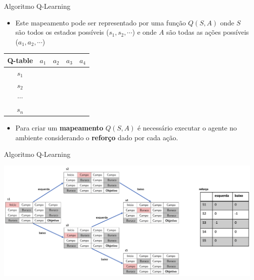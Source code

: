 \documentclass{beamer}
\begin{document}
\begin{frame}{Algoritmo Q-Learning}
	
\begin{itemize}
	
	\item Este mapeamento pode ser representado por uma função $Q(S,A)$ onde $S$ são 
	todos os estados possíveis ($s_{1}, s_{2}, \cdots$) e onde $A$ são todas as 
	ações possíveis ($a_{1}, a_{2}, \cdots$)

\end{itemize}

	\begin{center}
	\begin{tabular}{ |c|c|c|c|c| } 
		\hline
		 \textbf{Q-table}  & $a_{1}$ & $a_{2}$ & $a_{3}$& $a_{4}$ \\
		 \hline
		$s_{1}$&  &  &  & \\ 
		\hline
		$s_{2}$&  &  &  & \\ 
\hline
		$\cdots$&  &  &  & \\ 
\hline
		$s_{n}$&  &  &  & \\ 
\hline
	\end{tabular}
\end{center}

\begin{itemize}
	\item Para criar um \textbf{mapeamento} $Q(S,A)$ é necessário executar o 
	agente no ambiente considerando o \textbf{reforço} dado por cada ação. 
\end{itemize}

\end{frame}


\begin{frame}{Algoritmo Q-Learning}

  \begin{center}
	\includegraphics[width=\textwidth]{figuras/mapa1.png}
\end{center}

\end{frame}
\end{document}
